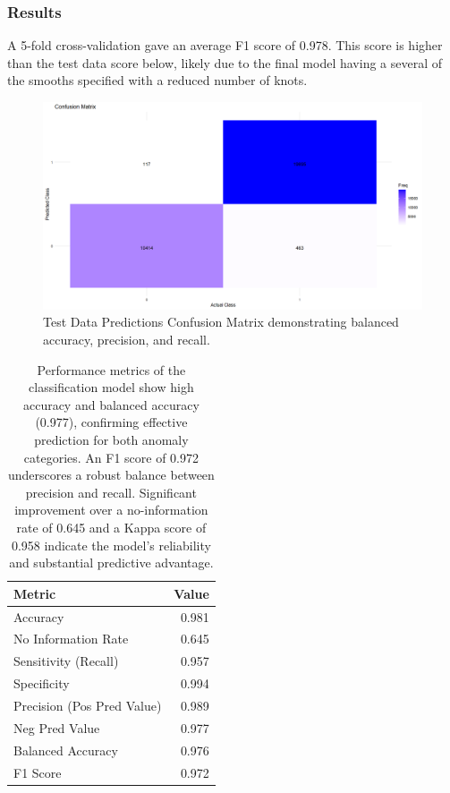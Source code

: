 \documentclass[12pt, twoside,hidelinks]{article}
\theoremstyle{definition}
\numberwithin{equation}{section}
\begin{document}
\subsubsection{Results}

A 5-fold cross-validation gave an average F1 score of 0.978. This score is higher than the test data score below, likely due to the final model having a several of the smooths specified with a reduced number of knots.

\begin{figure}[H]
\includegraphics[width=\textwidth]{visuals/temperature_model_anomalies/final_cm.png}
\caption{Test Data Predictions Confusion Matrix demonstrating balanced accuracy, precision, and recall.}
\label{confusion_matrix}
\end{figure}

\begin{table}[H]
\centering
\begin{tabular}{lr}
\hline
Metric & Value \\
\hline
Accuracy & 0.981 \\
No Information Rate & 0.645 \\
Sensitivity (Recall) & 0.957 \\
Specificity & 0.994 \\
Precision (Pos Pred Value) & 0.989 \\
Neg Pred Value & 0.977 \\
Balanced Accuracy & 0.976 \\
F1 Score & 0.972 \\
\hline
\end{tabular}
\caption{Performance metrics of the classification model show high accuracy and balanced accuracy (0.977), confirming effective prediction for both anomaly categories. An F1 score of 0.972 underscores a robust balance between precision and recall. Significant improvement over a no-information rate of 0.645 and a Kappa score of 0.958 indicate the model's reliability and substantial predictive advantage.}
\label{table:performance_metrics}
\end{table}
\end{document}
